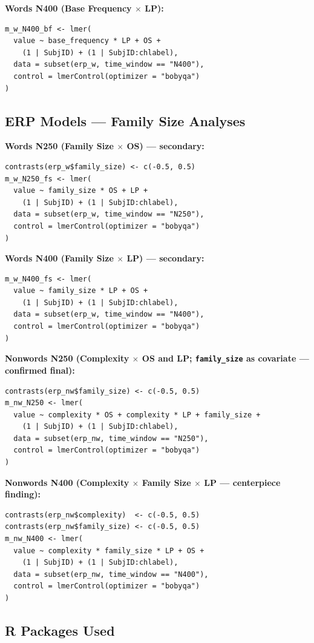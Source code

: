 \documentclass[11pt, a4paper]{article}
\begin{document}
\textbf{Words N400 (Base Frequency $\times$ LP):}
\begin{lstlisting}
m_w_N400_bf <- lmer(
  value ~ base_frequency * LP + OS +
    (1 | SubjID) + (1 | SubjID:chlabel),
  data = subset(erp_w, time_window == "N400"),
  control = lmerControl(optimizer = "bobyqa")
)
\end{lstlisting}

\subsection{ERP Models — Family Size Analyses}

\textbf{Words N250 (Family Size $\times$ OS) — secondary:}
\begin{lstlisting}
contrasts(erp_w$family_size) <- c(-0.5, 0.5)
m_w_N250_fs <- lmer(
  value ~ family_size * OS + LP +
    (1 | SubjID) + (1 | SubjID:chlabel),
  data = subset(erp_w, time_window == "N250"),
  control = lmerControl(optimizer = "bobyqa")
)
\end{lstlisting}

\textbf{Words N400 (Family Size $\times$ LP) — secondary:}
\begin{lstlisting}
m_w_N400_fs <- lmer(
  value ~ family_size * LP + OS +
    (1 | SubjID) + (1 | SubjID:chlabel),
  data = subset(erp_w, time_window == "N400"),
  control = lmerControl(optimizer = "bobyqa")
)
\end{lstlisting}

\textbf{Nonwords N250 (Complexity $\times$ OS and LP; \texttt{family\_size} as covariate — confirmed final):}
\begin{lstlisting}
contrasts(erp_nw$family_size) <- c(-0.5, 0.5)
m_nw_N250 <- lmer(
  value ~ complexity * OS + complexity * LP + family_size +
    (1 | SubjID) + (1 | SubjID:chlabel),
  data = subset(erp_nw, time_window == "N250"),
  control = lmerControl(optimizer = "bobyqa")
)
\end{lstlisting}

\textbf{Nonwords N400 (Complexity $\times$ Family Size $\times$ LP — centerpiece finding):}
\begin{lstlisting}
contrasts(erp_nw$complexity)  <- c(-0.5, 0.5)
contrasts(erp_nw$family_size) <- c(-0.5, 0.5)
m_nw_N400 <- lmer(
  value ~ complexity * family_size * LP + OS +
    (1 | SubjID) + (1 | SubjID:chlabel),
  data = subset(erp_nw, time_window == "N400"),
  control = lmerControl(optimizer = "bobyqa")
)
\end{lstlisting}

\subsection{R Packages Used}
\end{document}
